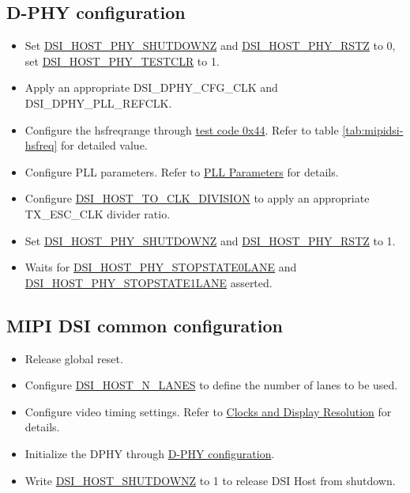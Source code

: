\documentclass[main\_\_EN.tex]{subfiles}
\begin{document}
\subsection{D-PHY configuration}
\label{sec:mipidsi-dsi-dphy-programming-proc}
\begin{itemize}
    \item Set \hyperref[fielddesc:DSIHOSTPHYSHUTDOWNZ]{DSI\_HOST\_PHY\_SHUTDOWNZ} and \hyperref[fielddesc:DSIHOSTPHYRSTZ]{DSI\_HOST\_PHY\_RSTZ} to 0, set \hyperref[fielddesc:DSIHOSTPHYTESTCLR]{DSI\_HOST\_PHY\_TESTCLR} to 1.
    \item Apply an appropriate DSI\_DPHY\_CFG\_CLK and DSI\_DPHY\_PLL\_REFCLK.
    \item Configure the hsfreqrange through \hyperref[sec:test-code-0x44]{test code 0x44}. Refer to table \ref{tab:mipidsi-hsfreq} for detailed value.
    \item Configure PLL parameters. Refer to \hyperref[sec:pll-parameters]{PLL Parameters} for details.
    \item Configure \hyperref[fielddesc:DSIHOSTTOCLKDIVISION]{DSI\_HOST\_TO\_CLK\_DIVISION} to apply an appropriate TX\_ESC\_CLK divider ratio.
    \item Set \hyperref[fielddesc:DSIHOSTPHYSHUTDOWNZ]{DSI\_HOST\_PHY\_SHUTDOWNZ} and \hyperref[fielddesc:DSIHOSTPHYRSTZ]{DSI\_HOST\_PHY\_RSTZ} to 1.
    \item Waits for \hyperref[fielddesc:DSIHOSTPHYSTOPSTATE0LANE]{DSI\_HOST\_PHY\_STOPSTATE0LANE} and \hyperref[fielddesc:DSIHOSTPHYSTOPSTATE1LANE]{DSI\_HOST\_PHY\_STOPSTATE1LANE} asserted.
\end{itemize}

\subsection{MIPI DSI common configuration}
\label{sec:mipidsi-dsi-common-programming-proc}
\begin{itemize}
    \item Release global reset.
    \item Configure \hyperref[fielddesc:DSIHOSTNLANES]{DSI\_HOST\_N\_LANES} to define the number of lanes to be used.
    \item Configure video timing settings. Refer to \hyperref[sec:clocks-and-display-resolution]{Clocks and Display Resolution} for details.
    \item Initialize the DPHY through \hyperref[sec:mipidsi-dsi-dphy-programming-proc]{D-PHY configuration}.
    \item Write \hyperref[fielddesc:DSIHOSTSHUTDOWNZ]{DSI\_HOST\_SHUTDOWNZ} to 1 to release DSI Host from shutdown.
\end{itemize}
\end{document}
